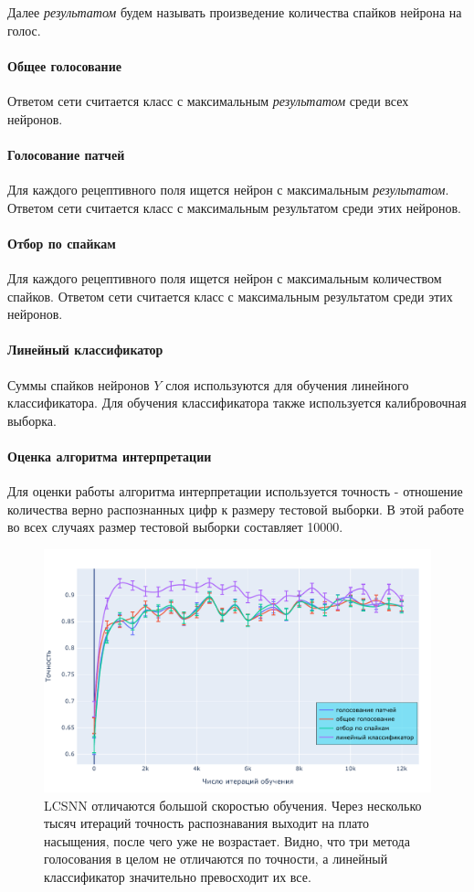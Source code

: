 \documentclass[a4paper]{article}
\begin{document}
Далее \textit{результатом} будем называть произведение количества спайков нейрона на голос.

\paragraph{Общее голосование}
Ответом сети считается класс с максимальным  \textit{результатом} среди всех нейронов.

\paragraph{Голосование патчей}
Для каждого рецептивного поля ищется нейрон с максимальным \textit{результатом}. Ответом сети считается класс с максимальным результатом среди этих нейронов.

\paragraph{Отбор по спайкам}
Для каждого рецептивного поля ищется нейрон с максимальным количеством спайков. Ответом сети считается класс с максимальным результатом среди этих нейронов.

\paragraph{Линейный классификатор}
Суммы спайков нейронов $Y$ слоя используются для обучения линейного классификатора. Для обучения классификатора также используется калибровочная выборка.

\paragraph{Оценка алгоритма интерпретации}
Для оценки работы алгоритма интерпретации используется точность - отношение количества верно распознанных цифр к размеру тестовой выборки. В этой работе во всех случаях размер тестовой выборки составляет 10000. 

\begin{figure}
\centering
 \includegraphics[width=.45\textwidth,keepaspectratio=true]{LCSNN_learning_rate_ru.pdf}
 \caption{LCSNN отличаются большой скоростью обучения. Через несколько тысяч итераций точность распознавания выходит на плато насыщения, после чего уже не возрастает. Видно, что три метода голосования в целом не отличаются по точности, а линейный классификатор значительно превосходит их все.}
\end{figure}
\end{document}
